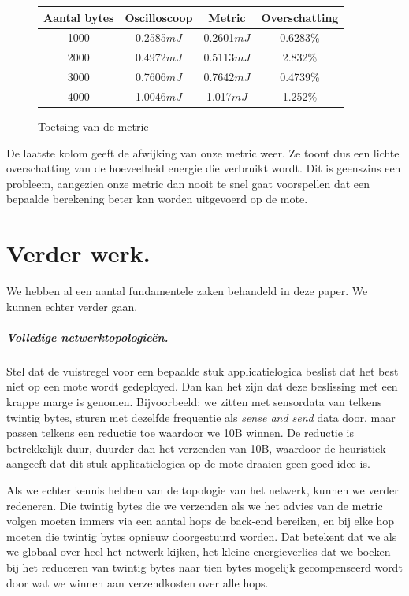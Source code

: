 \documentclass[11pt]{article}
\begin{document}
\begin{figure}[H]
\begin{tabular}{|c|c|c|c|}
\hline 
\cellcolor[gray]{0.8}Aantal bytes & \cellcolor[gray]{0.8} Oscilloscoop  & \cellcolor[gray]{0.8} Metric & \cellcolor[gray]{0.8} Overschatting \\ 
\hline 
1000 & 0.2585$mJ$ & 0.2601$mJ$ & 0.6283\% \\ 
\hline 
2000 & 0.4972$mJ$ & 0.5113$mJ$ & 2.832\% \\ 
\hline 
3000 & 0.7606$mJ$ & 0.7642$mJ$ & 0.4739\% \\ 
\hline 
4000 & 1.0046$mJ$ & 1.017$mJ$ & 1.252\% \\ 
\hline 
\end{tabular} 

\caption{Toetsing van de metric}
\label{tab:toetsing}
\end{figure}

De laatste kolom geeft de afwijking van onze metric weer. Ze toont dus een
lichte overschatting van de hoeveelheid energie die verbruikt wordt. Dit is
geenszins een probleem, aangezien onze metric dan nooit te snel gaat voorspellen dat
een bepaalde berekening beter kan worden uitgevoerd op de mote.

\section{Verder werk.} 

We hebben al een aantal fundamentele zaken behandeld in deze paper. We kunnen
echter verder gaan.
 
\subparagraph{Volledige netwerktopologie\"en.}

Stel dat de vuistregel voor een bepaalde stuk applicatielogica beslist dat het
best niet op een mote wordt gedeployed. Dan kan het zijn dat deze beslissing met
een krappe marge is genomen. Bijvoorbeeld: we zitten met sensordata van telkens
twintig bytes, sturen met dezelfde frequentie als \textit{sense and send} data door, maar
passen telkens een reductie toe waardoor we 10B winnen. De reductie is
betrekkelijk duur, duurder dan het verzenden van 10B, waardoor de heuristiek
aangeeft dat dit stuk applicatielogica op de mote draaien geen goed idee is. 

Als we echter kennis hebben van de topologie van het netwerk, kunnen we verder
redeneren. Die twintig bytes die we verzenden als we het advies van de metric
volgen moeten immers via een aantal hops de back-end bereiken, en bij elke hop
moeten die twintig bytes opnieuw doorgestuurd worden. Dat betekent dat we als we
globaal over heel het netwerk kijken, het kleine energieverlies dat we boeken
bij het reduceren van twintig bytes naar tien bytes mogelijk gecompenseerd wordt
door wat we winnen aan verzendkosten over alle hops.
\end{document}
